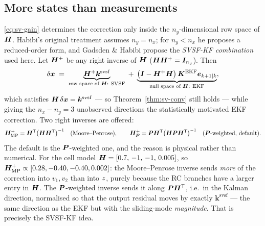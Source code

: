 \subsection{More states than measurements}\label{sec:sv-reduced}
\eqref{eq:sv-gain} determines the correction only inside the $n_y$-dimensional row space of
$\bm{H}$.  Habibi's original treatment assumes $n_y=n_x$; for $n_y<n_x$ he proposes a reduced-order
form, and Gadsden \& Habibi \cite{gadsden2010svsfcov} propose the \emph{SVSF-KF combination} used
here.  Let $\bm{H}^{+}$ be any right inverse of $\bm{H}$ ($\bm{H}\bm{H}^{+}=\bm{I}_{n_y}$).  Then
\begin{equation}
\delta\vx \;=\; \underbrace{\mH^{+}\bm{k}^{\mathrm{svsf}}}_{\text{row space of }\mH:\ \text{SVSF}}
 \;+\; \underbrace{\big(\mI-\mH^{+}\mH\big)\,\mK^{\mathrm{EKF}}\bm{e}_{k+1|k}}_{%
   \text{null space of }\mH:\ \text{EKF}},
\label{eq:sv-split}
\end{equation}
which satisfies $\bm{H}\,\delta\bm{x}=\bm{k}^{\mathrm{svsf}}$ --- so Theorem~\ref{thm:sv-conv} still
holds --- while giving the $n_x-n_y=3$ unobserved directions the statistically motivated EKF
correction.  Two right inverses are offered:
\begin{equation}
\bm{H}^{+}_{\mathrm{MP}}=\bm{H}^{\mathsf{T}}\big(\bm{H}\bm{H}^{\mathsf{T}}\big)^{-1}
\quad\text{(Moore--Penrose)},
\qquad
\bm{H}^{+}_{\bm{P}}=\bm{P}\bm{H}^{\mathsf{T}}\big(\bm{H}\bm{P}\bm{H}^{\mathsf{T}}\big)^{-1}
\quad\text{($\bm{P}$-weighted, default)}.
\label{eq:sv-pinv}
\end{equation}
The default is the $\bm{P}$-weighted one, and the reason is physical rather than numerical.  For the
cell model $\bm{H}=[0.7,\,-1,\,-1,\,0.005]$, so $\bm{H}^{+}_{\mathrm{MP}}\propto[0.28,-0.40,-0.40,0.002]$:
the Moore--Penrose inverse sends \emph{more} of the correction into $v_1,v_2$ than into $z$,
purely because the RC branches have a larger entry in $\bm{H}$.  The $\bm{P}$-weighted inverse sends it
along $\bm{P}\bm{H}^{\mathsf{T}}$, i.e.\ in the Kalman direction, normalised so that the output residual moves by
exactly $\bm{k}^{\mathrm{svsf}}$ --- the same direction as the EKF but with the sliding-mode
\emph{magnitude}.  That is precisely the SVSF-KF idea.

